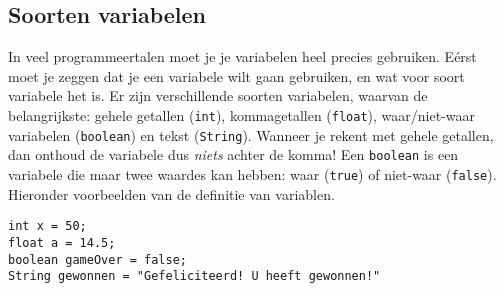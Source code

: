 \documentclass[a4paper,11pt]{report}
\begin{document}
\subsection{Soorten variabelen}

In veel programmeertalen moet je je variabelen heel precies gebruiken.
Eérst moet je zeggen dat je een variabele wilt gaan gebruiken, en wat voor
soort variabele het is.  Er zijn verschillende soorten variabelen, waarvan
de belangrijkste: gehele getallen (\verb|int|), kommagetallen
(\verb|float|), waar/niet-waar variabelen (\verb|boolean|) en tekst
(\verb|String|).  Wanneer je rekent met gehele getallen, dan onthoud de
variabele dus \emph{niets} achter de komma!  Een \verb|boolean| is een
variabele die maar twee waardes kan hebben: waar (\verb|true|) of
niet-waar (\verb|false|).  Hieronder voorbeelden van de definitie van
variablen.
\begin{verbatim}
int x = 50;
float a = 14.5;
boolean gameOver = false;
String gewonnen = "Gefeliciteerd! U heeft gewonnen!"
\end{verbatim}




\end{document}
